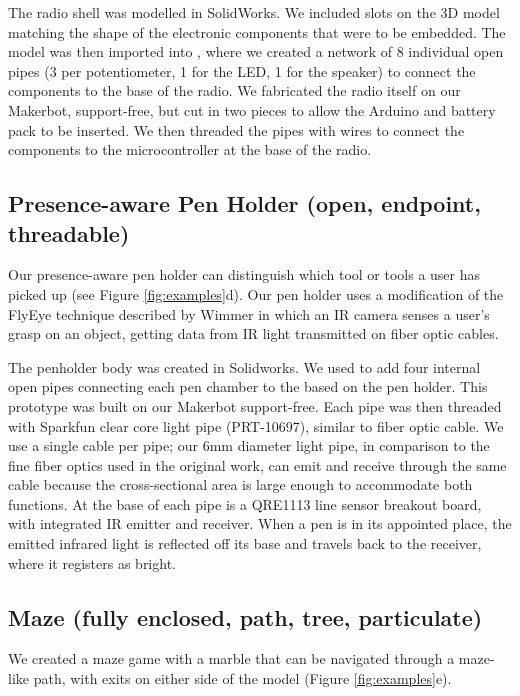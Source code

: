 The radio shell was modelled in SolidWorks. We included slots on the 3D model matching the shape of the electronic components that were to be embedded. The model was then imported into \systemnamenospace, where we created a network of 8 individual open pipes (3 per potentiometer, 1 for the LED, 1 for the speaker) to connect the components to the base of the radio. We fabricated the radio itself on our Makerbot, support-free, but cut in two pieces to allow the Arduino and battery pack to be inserted. We then threaded the pipes with wires to connect the components to the microcontroller at the base of the radio. 

\subsection{Presence-aware Pen Holder (open, endpoint, threadable)}
Our presence-aware pen holder can distinguish which tool or tools a user has picked up (see Figure \ref{fig:examples}d).  Our pen holder uses a modification of the FlyEye technique described by Wimmer \cite{Wimmer-flyeye} in which an IR camera senses a user's grasp on an object, getting data from IR light transmitted on fiber optic cables.

The penholder body was created in Solidworks. We used \systemname to add four internal open pipes connecting each pen chamber to the based on the pen holder. This prototype was built on our Makerbot support-free.  Each pipe was then threaded with Sparkfun clear core light pipe (PRT-10697), similar to fiber optic cable.  We use a single cable per pipe; our 6mm diameter light pipe, in comparison to the fine fiber optics used in the original work, can emit and receive through the same cable because the cross-sectional area is large enough to accommodate both functions. At the base of each pipe is a QRE1113 line sensor breakout board, with integrated IR emitter and receiver.   When a pen is in its appointed place, the emitted infrared light is reflected off its base and travels back to the receiver, where it registers as bright.  

\subsection{Maze (fully enclosed, path, tree, particulate)}

We created a maze game with a marble that can be navigated through a maze-like path, with exits on either side of the model (Figure \ref{fig:examples}e). 

